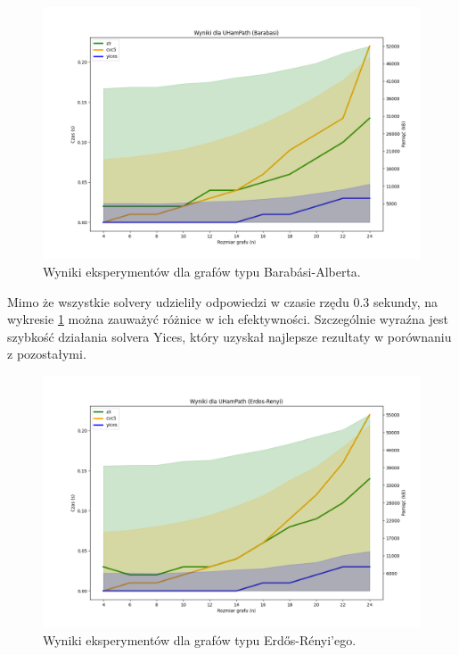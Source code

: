 \begin{figure}[htbp]
	\centering
	\begin{minipage}{\textwidth}
		\includegraphics[width=\textwidth]{./figures/2-barabasi-plot.png}
		\caption{Wyniki eksperymentów dla grafów typu Barabási-Alberta.}
		\label{fig:2-barabasi-plot}
	\end{minipage}
\end{figure}

Mimo że wszystkie solvery udzieliły odpowiedzi w czasie rzędu 0.3 sekundy, na wykresie \ref{fig:2-barabasi-plot} można zauważyć różnice w ich efektywności. Szczególnie wyraźna jest szybkość działania solvera Yices, który uzyskał najlepsze rezultaty w porównaniu z pozostałymi.

\begin{figure}[htbp]
	\centering
	\begin{minipage}{\textwidth}
		\includegraphics[width=\textwidth]{./figures/2-erdos-renyi-plot.png}
		\caption{Wyniki eksperymentów dla grafów typu Erdős-Rényi'ego.}
		\label{fig:2-erdos-renyi-plot}
	\end{minipage}
\end{figure}

